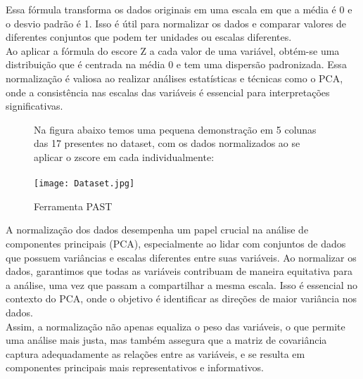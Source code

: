 \documentclass[a4paper,12pt]{article}
\begin{document}
Essa fórmula transforma os dados originais em uma escala em que a média é 0 e o desvio padrão é 1. Isso é útil para normalizar os dados e comparar valores de diferentes conjuntos que podem ter unidades ou escalas diferentes.\\
Ao aplicar a fórmula do escore Z a cada valor de uma variável, obtém-se uma distribuição que é centrada na média 0 e tem uma dispersão padronizada. Essa normalização é valiosa ao realizar análises estatísticas e técnicas como o PCA, onde a consistência nas escalas das variáveis é essencial para interpretações significativas.\\

\begin{figure}[h]
Na figura abaixo temos uma pequena demonstração em 5 colunas das 17 presentes no dataset, com os dados normalizados ao se aplicar o zscore em cada individualmente:\\\\
    \centering
    \texttt{[image: Dataset.jpg]}
    \caption{Ferramenta PAST}
    \label{fig:enter-label}
\end{figure}

A normalização dos dados desempenha um papel crucial na análise de componentes principais (PCA), especialmente ao lidar com conjuntos de dados que possuem variâncias e escalas diferentes entre suas variáveis. Ao normalizar os dados, garantimos que todas as variáveis contribuam de maneira equitativa para a análise, uma vez que passam a compartilhar a mesma escala. Isso é essencial no contexto do PCA, onde o objetivo é identificar as direções de maior variância nos dados.\\
Assim, a normalização não apenas equaliza o peso das variáveis, o que permite uma análise mais justa, mas também assegura que a matriz de covariância captura adequadamente as relações entre as variáveis, e se resulta em componentes principais mais representativos e informativos.\\
\end{document}

